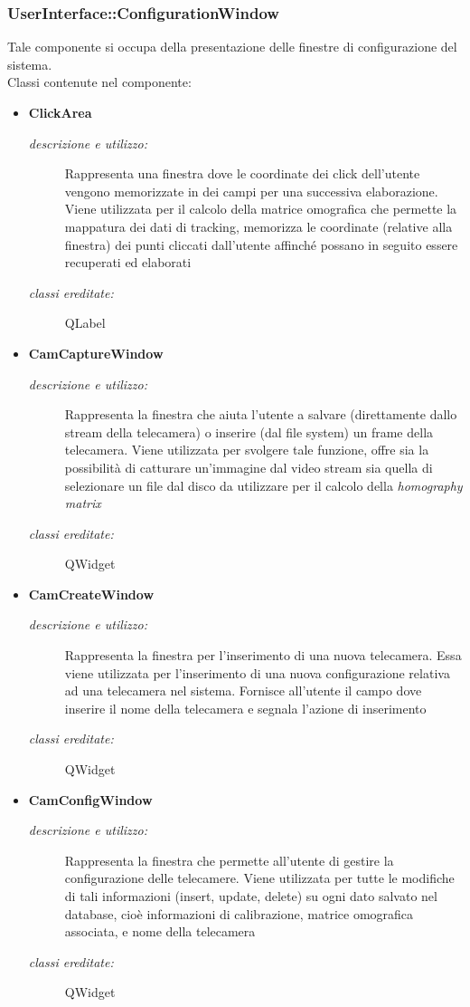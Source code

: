 \subsubsection{UserInterface::ConfigurationWindow} \label{sec:c1.1}
Tale componente si occupa della presentazione delle finestre di configurazione del sistema. \\
Classi contenute nel componente: 
\begin{itemize} 
\item \textbf{ClickArea}
\begin{description}
\item [\textit{descrizione e utilizzo:}] Rappresenta una finestra dove le coordinate dei click dell'utente vengono memorizzate in dei campi per una successiva elaborazione. Viene utilizzata per il calcolo della matrice omografica che permette la mappatura dei dati di tracking, memorizza le coordinate (relative alla finestra) dei punti cliccati dall'utente affinché possano in seguito essere recuperati ed elaborati
\item [\textit{classi ereditate:}] QLabel
\end{description}
\item \textbf{CamCaptureWindow}
\begin{description}
\item [\textit{descrizione e utilizzo:}] Rappresenta la finestra che aiuta l'utente a salvare (direttamente dallo stream della telecamera) o inserire (dal file system) un frame della telecamera. Viene utilizzata per svolgere tale funzione, offre sia la possibilità di catturare un'immagine dal video stream sia quella di selezionare un file dal disco da utilizzare per il calcolo della \textit{homography matrix}
\item [\textit{classi ereditate:}] QWidget
\end{description}
\item \textbf{CamCreateWindow}
\begin{description}
\item [\textit{descrizione e utilizzo:}] Rappresenta la finestra per l'inserimento di una nuova telecamera. Essa viene utilizzata per l'inserimento di una nuova configurazione relativa ad una telecamera nel sistema. Fornisce all'utente il campo dove inserire il nome della telecamera e segnala l'azione di inserimento 
\item [\textit{classi ereditate:}] QWidget
\end{description}
\item \textbf{CamConfigWindow}
\begin{description}
\item [\textit{descrizione e utilizzo:}] Rappresenta la finestra che permette all'utente di gestire la configurazione delle telecamere. Viene utilizzata per tutte le modifiche di tali informazioni (insert, update, delete) su ogni dato salvato nel database, cioè informazioni di calibrazione, matrice omografica associata, e nome della telecamera
\item [\textit{classi ereditate:}] QWidget
\end{description}
\end{itemize}

